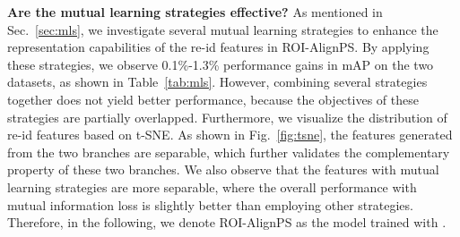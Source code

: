 \documentclass[journal]{IEEEtran}
\begin{document}
\textbf{Are the mutual learning strategies effective?}
As mentioned in Sec.~\ref{sec:mls}, we investigate several mutual learning strategies to enhance the representation capabilities of the re-id features in ROI-AlignPS. By applying these strategies, we observe 0.1\%-1.3\% performance gains in mAP on the two datasets, as shown in Table~\ref{tab:mls}. However, combining several strategies together does not yield better performance, because the objectives of these strategies are partially overlapped. Furthermore, we visualize the distribution of re-id features based on t-SNE. As shown in Fig.~\ref{fig:tsne}, the features generated from the two branches are separable, which further validates the complementary property of these two branches. We also observe that the features with mutual learning strategies are more separable, where the overall performance with mutual information loss is slightly better than employing other strategies. Therefore, in the following, we denote ROI-AlignPS as the model trained with . 
\end{document}
